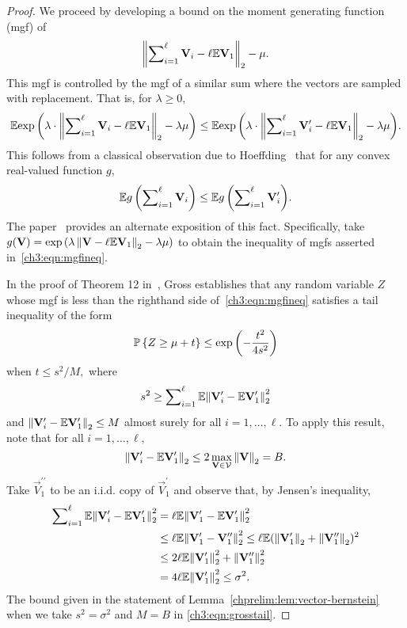 \begin{proof}
 We proceed by developing a bound on the moment generating function (mgf) of
\[
\left\|\sum\nolimits_{i=1}^\ell \mathbf{V}_i - \ell\mathbb{E}{\mathbf{V}_1}\right\|_2 - \mu.
\]
This mgf is controlled by the mgf of a similar sum where the vectors are sampled with replacement. That is, for $\lambda \geq 0,$
\begin{equation}
\label{ch3:eqn:mgfineq}
 \mathbb{E}{\mathrm{exp}\left(\lambda \cdot \left\|\sum\nolimits_{i=1}^\ell \mathbf{V}_i - \ell\mathbb{E}{\mathbf{V}_1}\right\|_2 - \lambda \mu\right)} \leq
\mathbb{E}{\mathrm{exp}\left(\lambda \cdot \left\|\sum\nolimits_{i=1}^\ell \mathbf{V}_i^\prime - \ell\mathbb{E}{\mathbf{V}_1}\right\|_2 - \lambda \mu\right)}.
\end{equation}
This follows from a classical observation due to Hoeffding~\cite{Hoe63} 
that for any convex real-valued function $g,$
\[
 \mathbb{E}{g\left( \sum\nolimits_{i=1}^\ell \mathbf{V}_i \right)}\leq \mathbb{E}{g\left(\sum\nolimits_{i=1}^\ell \mathbf{V}_i^\prime \right)}.
\]
The paper~\cite{GN10} provides an alternate exposition of this fact.
Specifically, take $g(\mathbf{V}) = \mathrm{exp}\left(\lambda\left\|\mathbf{V} 
- \ell \mathbb{E}{\mathbf{V}_1}\right\|_2 - \lambda \mu\right)$ to obtain the inequality of mgfs
asserted in~\eqref{ch3:eqn:mgfineq}.

In the proof of Theorem 12 in~\cite{Gross11}, Gross establishes that any 
random variable $Z$ whose mgf is less than the righthand side of~\eqref{ch3:eqn:mgfineq} 
satisfies a tail inequality of the form
\begin{equation}
\label{ch3:eqn:grosstail}
 \mathbb{P}\left\{ Z \geq \mu + t \right\} \leq \mathrm{exp}\left( -\frac{t^2}{4s^2} \right)
\end{equation}
when $t \leq s^2/M,$ where
\[
s^2 \geq \sum\nolimits_{i=1}^\ell \mathbb{E}{\left\|\mathbf{V}_i^\prime - \mathbb{E}{\mathbf{V}_1^\prime} \right\|_2^2}
\]
and $\left\|\mathbf{V}_i^\prime - \mathbb{E}{\mathbf{V}_1^\prime}\right\|_2 \leq M$ almost surely for all $i=1,\ldots,\ell.$
 To apply this result, note that for all $i=1,\ldots,\ell,$
 \[
  \left\|\mathbf{V}_i^\prime - \mathbb{E}{\mathbf{V}_1^\prime}\right\|_2 \leq 2 \max_{\mathbf{V} \in \mathcal{V}} \left\|\mathbf{V}\right\|_2 = B.
 \]
Take $\vec{V}_1^{\prime\prime}$ to be an i.i.d. copy of $\vec{V}_1^\prime$ and observe that, by Jensen's inequality,
 \begin{align*}
  \sum\nolimits_{i=1}^\ell \mathbb{E}{\left\|\mathbf{V}_i^\prime - \mathbb{E}{\mathbf{V}_1^\prime} \right\|_2^2} & = \ell \mathbb{E}{\left\|\mathbf{V}_1^\prime - \mathbb{E}{\mathbf{V}_1^\prime} \right\|_2^2} \\
  & \leq \ell \mathbb{E}{\left\|\mathbf{V}_1^\prime - \mathbf{V}_1^{\prime\prime}\right\|_2^2 } \leq \ell \mathbb{E}{ (\left\|\mathbf{V}_1^\prime\right\|_2 + \left\|\mathbf{V}_1^{\prime \prime}\right\|_2)^2} \\
  & \leq 2 \ell \mathbb{E}{ \left\|\mathbf{V}_1^\prime\right\|_2^2 + \left\|\mathbf{V}_1^{\prime\prime}\right\|_2^2 } \\
  & = 4 \ell \mathbb{E}{ \left\|\mathbf{V}_1^\prime\right\|_2^2 } \leq \sigma^2.
 \end{align*}
The bound given in the statement of Lemma~\ref{chprelim:lem:vector-bernstein} 
when we take $s^2 = \sigma^2$ and $M = B$ in \eqref{ch3:eqn:grosstail}.
\end{proof}

